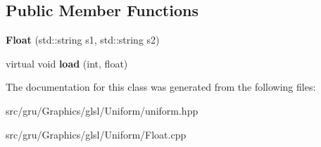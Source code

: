 \subsection*{\-Public \-Member \-Functions}
\begin{DoxyCompactItemize}
\item 
\hypertarget{classglutpp_1_1glsl_1_1Uniform_1_1Vector_1_1Float_a5c2afdd69744887aa0b10a6f1c915fec}{{\bfseries \-Float} (std\-::string s1, std\-::string s2)}\label{classglutpp_1_1glsl_1_1Uniform_1_1Vector_1_1Float_a5c2afdd69744887aa0b10a6f1c915fec}

\item 
\hypertarget{classglutpp_1_1glsl_1_1Uniform_1_1Vector_1_1Float_a76a64c4d0b3237bb2195048f88cb660d}{virtual void {\bfseries load} (int, float)}\label{classglutpp_1_1glsl_1_1Uniform_1_1Vector_1_1Float_a76a64c4d0b3237bb2195048f88cb660d}

\end{DoxyCompactItemize}


\-The documentation for this class was generated from the following files\-:\begin{DoxyCompactItemize}
\item 
src/gru/\-Graphics/glsl/\-Uniform/uniform.\-hpp\item 
src/gru/\-Graphics/glsl/\-Uniform/\-Float.\-cpp\end{DoxyCompactItemize}
